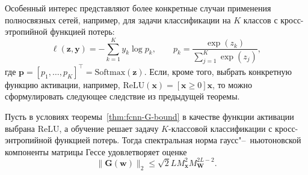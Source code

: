 Особенный интерес представляют более конкретные случаи применения полносвязных сетей, например, для задачи классификации на $K$ классов с кросс-этропийной функцией потерь:
\begin{equation}
    \ell(\mathbf{z}, \mathbf{y})
    =
    -\sum_{k=1}^K y_k \log p_k,
    \qquad
    p_k
    =
    \frac{\exp(z_k)}{\sum_{j=1}^K \exp(z_j)},
\end{equation}
где $\mathbf{p} = [p_1, \ldots, p_K]^\top = \mathrm{Softmax}(\mathbf{z})$. Если, кроме того, выбрать конкретную функцию активации, например, $\mathrm{ReLU}(\mathbf{x}) = [\mathbf{x} \geqslant 0] \mathbf{x}$, то можно сформулировать следующее следствие из предыдущей теоремы.

\begin{corollary}
    \label{cor:fcnn-G-bound-relu-ce}
    Пусть в условиях теоремы~\ref{thm:fcnn-G-bound} в качестве функции активации выбрана $\mathrm{ReLU}$, а обучение решает задачу $K$-классовой классификации с кросс-энтропийной функцией потерь.
    Тогда спектральная норма гаусс"--~ньютоновской компоненты матрицы Гессе удовлетворяет оценке
    \begin{equation}
        \label{eq:fcnn-G-bound-relu-ce}
        \|\mathbf{G}(\mathbf{w})\|_2
        \le
        \sqrt{2} L M_{\mathbf{x}}^2 M_{\mathbf{W}}^{2L-2}.
    \end{equation}
\end{corollary}

